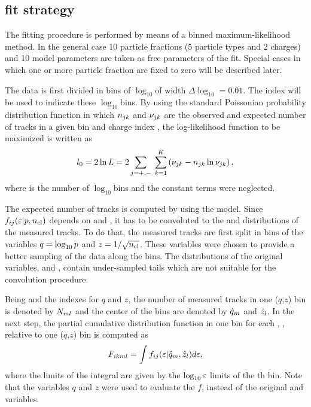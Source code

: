 \subsection{\dedx fit strategy}
\label{sec:hadron:dedx:fit}


The fitting procedure is performed by means of a binned maximum-likelihood method.
In the general case 10 particle fractions (5 particle types and 2 charges) and
10 model parameters are taken as free parameters of the fit. Special cases
in which one or more particle fraction are fixed to zero will be described later.

The \eps data is first divided in bins of $\log_{10}$\eps of width $\Delta\log_{10}$\eps$=0.01$.
The index \ieps will be used to indicate these $\log_{10}$\eps bins.
By using the standard Poissonian probability distribution function in which
$n_{jk}$ and $\nu_{jk}$ are the observed and expected
number of tracks in a given bin \ieps and charge index \ich,
the log-likelihood function to be maximized is written as
\begin{equation}
  l_0 = 2\ln L = 2\sum_{j=+,-}\;\sum_{k=1}^{K} \left(\nu_{jk} - n_{jk}\ln\nu_{jk}\right), 
  \label{eq:hadron:dedx:fit:l0}
\end{equation}
where \neps is the number of $\log_{10}$\eps bins and the constant terms were neglected.

The expected number of tracks is computed by using
the \eps model. Since $f_{ij}(\mbox{$\varepsilon$}|p,\mbox{$n_{\text{cl}}$})$ depends on \pp and \ncl,
it has to be convoluted to the \pp and \ncl distributions
of the measured tracks.
To do that, the measured tracks are first split in
bins of the variables $q = \log_{10}p$ and $z = 1/\sqrt{\mbox{$n_{\text{cl}}$}}$.
These variables were chosen to provide a better sampling
of the data along the bins. The distributions of the
original variables, \pp and \ncl, contain under-sampled
tails which are not suitable for the convolution procedure.

Being \iq and \iz the indexes for $q$ and $z$, the
number of measured tracks in one ($q$,$z$) bin is denoted
by $N_{ml}$ and the center of the bins are denoted
by $\hat{q}_{m}$ and $\hat{z}_{l}$. In the next step, the partial
cumulative distribution function in one \ieps bin for each \ipart, \ich,
relative to one ($q$,$z$) bin is computed as
\begin{equation}
  F_{ikml} = \int f_{ij}(\mbox{$\varepsilon$}|\hat{q}_{m},\hat{z}_{l}) d\mbox{$\varepsilon$},
\end{equation}
where the limits of the integral are given by the $\log_{10}\mbox{$\varepsilon$}$
limits of the {\ieps}th bin. Note that the variables $q$ and $z$
were used to evaluate the $f$,
instead of the original \pp and \ncl variables.

